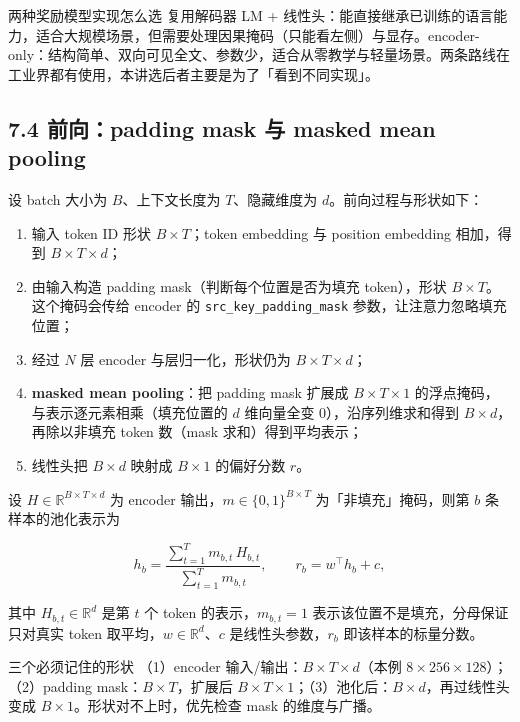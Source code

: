 \begin{knowledgebox}{两种奖励模型实现怎么选}
复用解码器 LM + 线性头：能直接继承已训练的语言能力，适合大规模场景，但需要处理因果掩码（只能看左侧）与显存。encoder-only：结构简单、双向可见全文、参数少，适合从零教学与轻量场景。两条路线在工业界都有使用，本讲选后者主要是为了「看到不同实现」。
\end{knowledgebox}

\subsection{7.4 前向：padding mask 与 masked mean pooling}

设 batch 大小为 $B$、上下文长度为 $T$、隐藏维度为 $d$。前向过程与形状如下：

\begin{enumerate}
\item 输入 token ID 形状 $B\times T$；token embedding 与 position embedding 相加，得到 $B\times T\times d$；
\item 由输入构造 padding mask（判断每个位置是否为填充 token），形状 $B\times T$。这个掩码会传给 encoder 的 \texttt{src\_key\_padding\_mask} 参数，让注意力忽略填充位置；
\item 经过 $N$ 层 encoder 与层归一化，形状仍为 $B\times T\times d$；
\item \textbf{masked mean pooling}：把 padding mask 扩展成 $B\times T\times 1$ 的浮点掩码，与表示逐元素相乘（填充位置的 $d$ 维向量全变 0），沿序列维求和得到 $B\times d$，再除以非填充 token 数（mask 求和）得到平均表示；
\item 线性头把 $B\times d$ 映射成 $B\times 1$ 的偏好分数 $r$。
\end{enumerate}

设 $H\in\mathbb{R}^{B\times T\times d}$ 为 encoder 输出，$m\in\{0,1\}^{B\times T}$ 为「非填充」掩码，则第 $b$ 条样本的池化表示为

$$
h_b=\frac{\sum_{t=1}^{T} m_{b,t}\,H_{b,t}}{\sum_{t=1}^{T} m_{b,t}},
\qquad
r_b = w^{\top} h_b + c,
$$

其中 $H_{b,t}\in\mathbb{R}^{d}$ 是第 $t$ 个 token 的表示，$m_{b,t}=1$ 表示该位置不是填充，分母保证只对真实 token 取平均，$w\in\mathbb{R}^{d}$、$c$ 是线性头参数，$r_b$ 即该样本的标量分数。

\begin{importantbox}{三个必须记住的形状}
（1）encoder 输入/输出：$B\times T\times d$（本例 $8\times256\times128$）；（2）padding mask：$B\times T$，扩展后 $B\times T\times 1$；（3）池化后：$B\times d$，再过线性头变成 $B\times 1$。形状对不上时，优先检查 mask 的维度与广播。
\end{importantbox}

